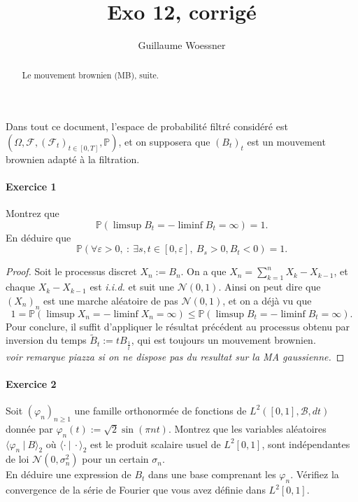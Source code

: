 \documentclass{article}
\title{Exo 12, corrigé}
\author{Guillaume Woessner}
\date{}                       %
\theoremstyle{definition}
\numberwithin{equation}{section}
\begin{document}
\maketitle                    %

\begin{abstract}
\begin{center}
Le mouvement brownien (MB), suite.
\end{center}
\end{abstract}



Dans tout ce document, l'espace de probabilité filtré considéré est $(\Omega,\mathcal{F},(\mathcal{F}_t)_{t\in[0,T]},\mathbb{P})$, et on supposera que $(B_t)_t$ est un mouvement brownien adapté à la filtration.


\paragraph{Exercice 1}
Montrez que
$$ \mathbb{P}(\limsup B_t = - \liminf B_t = \infty)=1. $$
En déduire que 
$$ \mathbb{P}(\forall \varepsilon>0,~:~\exists s,t \in [0,\varepsilon],~B_s>0,B_t<0)=1. $$

\begin{proof}
Soit le processus discret $X_n:=B_n$. On a que $X_n=\sum_{k=1}^n X_k-X_{k-1}$, et chaque $X_k-X_{k-1}$ est \textit{i.i.d.} et suit une $\mathcal{N}(0,1)$. Ainsi on peut dire que $(X_n)_n$ est une marche aléatoire de pas $\mathcal{N}(0,1)$, et on a déjà vu que 
$$ 1 = \mathbb{P}(\limsup X_n = - \liminf X_n = \infty) \leq \mathbb{P}(\limsup B_t = - \liminf B_t = \infty).$$
Pour conclure, il suffit d'appliquer le résultat précédent au processus obtenu par inversion du temps $\tilde{B}_t := tB_{\frac{1}{t}}$, qui est toujours un mouvement brownien.\\
\textit{voir remarque piazza si on ne dispose pas du resultat sur la MA gaussienne.}
\end{proof}



\paragraph{Exercice 2}
Soit $(\varphi_n)_{n\geq 1}$ une famille orthonormée de fonctions de $L^2([0,1],\mathcal{B},dt)$ donnée par $\varphi_n(t):=\sqrt{2}\sin(\pi n t)$. Montrez que les variables aléatoires $\langle \varphi_n~|~B\rangle_2$ où $\langle\cdot~|~\cdot \rangle_2$ est le produit scalaire usuel de $L^2[0,1]$, sont indépendantes de loi $\mathcal{N}(0,\sigma_n^2)$ pour un certain $\sigma_n$.\\
En déduire une expression de $B_t$ dans une base comprenant les $\varphi_n$. Vérifiez la convergence de la série de Fourier que vous avez définie dans $L^2[0,1]$.
\end{document}
